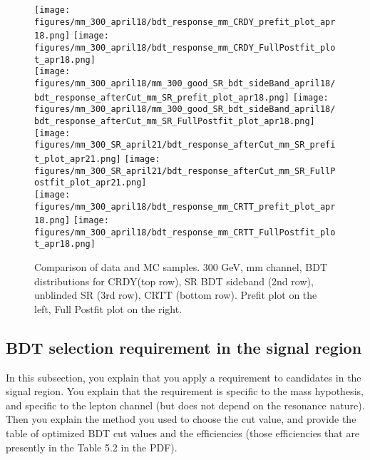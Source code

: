 \begin{figure}[tbp]
  \begin{center}
    \texttt{[image: figures/mm\_300\_april18/bdt\_response\_mm\_CRDY\_prefit\_plot\_apr18.png]}
    \texttt{[image: figures/mm\_300\_april18/bdt\_response\_mm\_CRDY\_FullPostfit\_plot\_apr18.png]}\\
    \texttt{[image: figures/mm\_300\_april18/mm\_300\_good\_SR\_bdt\_sideBand\_april18/bdt\_response\_afterCut\_mm\_SR\_prefit\_plot\_apr18.png]}
    \texttt{[image: figures/mm\_300\_april18/mm\_300\_good\_SR\_bdt\_sideBand\_april18/bdt\_response\_afterCut\_mm\_SR\_FullPostfit\_plot\_apr18.png]}\\
    \texttt{[image: figures/mm\_300\_SR\_april21/bdt\_response\_afterCut\_mm\_SR\_prefit\_plot\_apr21.png]}
    \texttt{[image: figures/mm\_300\_SR\_april21/bdt\_response\_afterCut\_mm\_SR\_FullPostfit\_plot\_apr21.png]}\\
    \texttt{[image: figures/mm\_300\_april18/bdt\_response\_mm\_CRTT\_prefit\_plot\_apr18.png]}
    \texttt{[image: figures/mm\_300\_april18/bdt\_response\_mm\_CRTT\_FullPostfit\_plot\_apr18.png]}\\
    \caption{Comparison of data and MC samples. 300 GeV, mm channel, BDT distributions for CRDY(top row), SR BDT sideband (2nd row), unblinded SR (3rd row), CRTT (bottom row). Prefit plot on the left,           Full Postfit plot on the right.}
    \label{fig:bdt_mm}
  \end{center}
\end{figure}




\subsection{BDT selection requirement in the signal region}

           
                 In this subsection, you explain that  you apply a requirement to candidates in the signal region.
           You explain that the requirement is specific to the mass hypothesis, and specific to the lepton channel
           (but does not depend on the resonance nature). Then you explain the  method you used to choose 
           the cut value, and provide the table of optimized BDT cut values and the efficiencies (those efficiencies
           that  are presently in the  Table 5.2 in the PDF).

